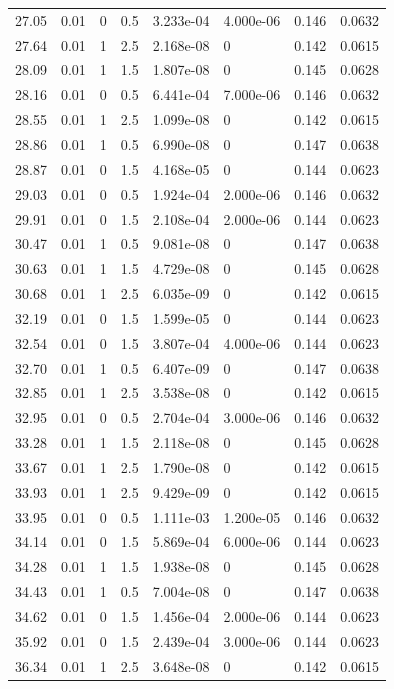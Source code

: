 \documentclass[preview]{standalone}
\begin{document}
{{{\begin{tabular}{L{1.2cm}C{1.2cm} C{0.3cm}C{0.5cm} C{1.4cm}C{1.4cm} C{1.4cm}C{1.4cm}}
  27.05  &  0.01  & 0     & 0.5 &  3.233e-04  & 4.000e-06  & 0.146 &  0.0632   \\ 
  27.64  &  0.01  & 1     & 2.5 &  2.168e-08  & 0  & 0.142 &  0.0615   \\ 
  28.09  &  0.01  & 1     & 1.5 &  1.807e-08  & 0  & 0.145 &  0.0628   \\ 
  28.16  &  0.01  & 0     & 0.5 &  6.441e-04  & 7.000e-06  & 0.146 &  0.0632   \\ 
  28.55  &  0.01  & 1     & 2.5 &  1.099e-08  & 0  & 0.142 &  0.0615   \\ 
  28.86  &  0.01  & 1     & 0.5 &  6.990e-08  & 0  & 0.147 &  0.0638   \\ 
  28.87  &  0.01  & 0     & 1.5 &  4.168e-05  & 0  & 0.144 &  0.0623   \\ 
  29.03  &  0.01  & 0     & 0.5 &  1.924e-04  & 2.000e-06  & 0.146 &  0.0632   \\ 
  29.91  &  0.01  & 0     & 1.5 &  2.108e-04  & 2.000e-06  & 0.144 &  0.0623   \\ 
  30.47  &  0.01  & 1     & 0.5 &  9.081e-08  & 0  & 0.147 &  0.0638   \\ 
  30.63  &  0.01  & 1     & 1.5 &  4.729e-08  & 0  & 0.145 &  0.0628   \\ 
  30.68  &  0.01  & 1     & 2.5 &  6.035e-09  & 0  & 0.142 &  0.0615   \\ 
  32.19  &  0.01  & 0     & 1.5 &  1.599e-05  & 0  & 0.144 &  0.0623   \\ 
  32.54  &  0.01  & 0     & 1.5 &  3.807e-04  & 4.000e-06  & 0.144 &  0.0623   \\ 
  32.70  &  0.01  & 1     & 0.5 &  6.407e-09  & 0  & 0.147 &  0.0638   \\ 
  32.85  &  0.01  & 1     & 2.5 &  3.538e-08  & 0  & 0.142 &  0.0615   \\ 
  32.95  &  0.01  & 0     & 0.5 &  2.704e-04  & 3.000e-06  & 0.146 &  0.0632   \\ 
  33.28  &  0.01  & 1     & 1.5 &  2.118e-08  & 0  & 0.145 &  0.0628   \\ 
  33.67  &  0.01  & 1     & 2.5 &  1.790e-08  & 0  & 0.142 &  0.0615   \\ 
  33.93  &  0.01  & 1     & 2.5 &  9.429e-09  & 0  & 0.142 &  0.0615   \\ 
  33.95  &  0.01  & 0     & 0.5 &  1.111e-03  & 1.200e-05  & 0.146 &  0.0632   \\ 
  34.14  &  0.01  & 0     & 1.5 &  5.869e-04  & 6.000e-06  & 0.144 &  0.0623   \\ 
  34.28  &  0.01  & 1     & 1.5 &  1.938e-08  & 0  & 0.145 &  0.0628   \\ 
  34.43  &  0.01  & 1     & 0.5 &  7.004e-08  & 0  & 0.147 &  0.0638   \\ 
  34.62  &  0.01  & 0     & 1.5 &  1.456e-04  & 2.000e-06  & 0.144 &  0.0623   \\ 
  35.92  &  0.01  & 0     & 1.5 &  2.439e-04  & 3.000e-06  & 0.144 &  0.0623   \\ 
  36.34  &  0.01  & 1     & 2.5 &  3.648e-08  & 0  & 0.142 &  0.0615   \\ 
\hline 
\end{tabular} 

}}}
\end{document}
